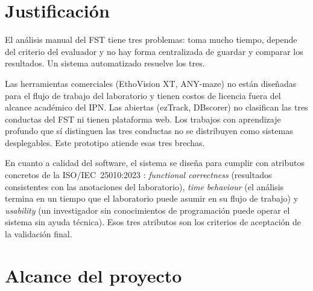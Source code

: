 \section{Justificación}

El análisis manual del FST tiene tres problemas: toma mucho tiempo, depende del
criterio del evaluador y no hay forma centralizada de guardar y comparar los resultados.
Un sistema automatizado resuelve los tres.

Las herramientas comerciales (EthoVision XT, ANY-maze) no están diseñadas para el flujo
de trabajo del laboratorio y tienen costos de licencia fuera del alcance académico del
IPN. Las abiertas (ezTrack, DBscorer) no clasifican las tres conductas del FST ni tienen
plataforma web. Los trabajos con aprendizaje profundo que sí distinguen las tres
conductas \cite{della_valle2025,meng2024_dsaan} no se distribuyen como sistemas
desplegables. Este prototipo atiende esas tres brechas.

En cuanto a calidad del software, el sistema se diseña para cumplir con atributos
concretos de la ISO/IEC~25010:2023 \cite{iso25010}: \textit{functional correctness}
(resultados consistentes con las anotaciones del laboratorio), \textit{time behaviour}
(el análisis termina en un tiempo que el laboratorio puede asumir en su flujo de
trabajo) y \textit{usability} (un investigador sin conocimientos de programación puede
operar el sistema sin ayuda técnica). Esos tres atributos son los criterios de
aceptación de la validación final.


\section{Alcance del proyecto}

